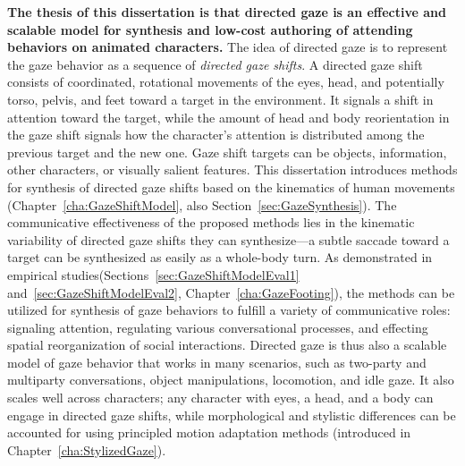\textbf{The thesis of this dissertation is that directed gaze is an effective and scalable model for synthesis and low-cost authoring of attending behaviors on animated characters.} The idea of directed gaze is to represent the gaze behavior as a sequence of \emph{directed gaze shifts}. A directed gaze shift consists of coordinated, rotational movements of the eyes, head, and potentially torso, pelvis, and feet toward a target in the environment. It signals a shift in attention toward the target, while the amount of head and body reorientation in the gaze shift signals how the character's attention is distributed among the previous target and the new one. Gaze shift targets can be objects, information, other characters, or visually salient features. This dissertation introduces methods for synthesis of directed gaze shifts based on the kinematics of human movements (Chapter~\ref{cha:GazeShiftModel}, also Section~\ref{sec:GazeSynthesis}). The communicative effectiveness of the proposed methods lies in the kinematic variability of directed gaze shifts they can synthesize---a subtle saccade toward a target can be synthesized as easily as a whole-body turn. As demonstrated in empirical studies(Sections~\ref{sec:GazeShiftModelEval1} and~\ref{sec:GazeShiftModelEval2}, Chapter~\ref{cha:GazeFooting}), the methods can be utilized for synthesis of gaze behaviors to fulfill a variety of communicative roles: signaling attention, regulating various conversational processes, and effecting spatial reorganization of social interactions. Directed gaze is thus also a scalable model of gaze behavior that works in many scenarios, such as two-party and multiparty conversations, object manipulations, locomotion, and idle gaze. It also scales well across characters; any character with eyes, a head, and a body can engage in directed gaze shifts, while morphological and stylistic differences can be accounted for using principled motion adaptation methods (introduced in Chapter~\ref{cha:StylizedGaze}).

